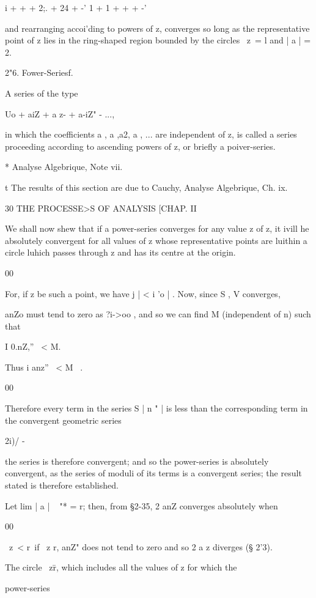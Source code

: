 i + + + 2;. + 24 + -' 1 + 1 + + + -'

and rearranging accoi'ding to powers of z, converges so long as the
representative point of z lies in the ring-shaped region bounded by
the circles \ z\ = l and | a | = 2.

2"6. Fower-Seriesf.

A series of the type

Uo + aiZ + a z- + a-iZ" - ...,

in which the coefficients a , a ,a2, a , ... are independent of z, is
called a series proceeding according to ascending powers of z, or
briefly a poiver-series.

* Analyse Algebrique, Note vii.

t The results of this section are due to Cauchy, Analyse Algebrique,
Ch. ix.



  30 THE PROCESSE>S OF ANALYSIS [CHAP. II

We shall now shew that if a power-series converges for any value z of
z, it ivill he absolutely convergent for all values of z whose
representative points are luithin a circle luhich passes through z and
has its centre at the origin.

00

For, if z be such a point, we have j | < i 'o | . Now, since S , V
converges,

anZo must tend to zero as ?i->oo , and so we can find M (independent
of n) such that

I 0.nZ,'' \ < M.

Thus i anz'' \ < M \ .

00

Therefore every term in the series S | n " | is less than the
corresponding term in the convergent geometric series

2i)/ -

the series is therefore convergent; and so the power-series is
absolutely convergent, as the series of moduli of its terms is a
convergent series; the result stated is therefore established.

Let lim | a | ~ "* = r; then, from §2-35, 2 anZ converges absolutely
when

00

\ z\ < r\ if \ z r, anZ" does not tend to zero and so 2 a z diverges
(§ 2'3).

The circle \ z\=r, which includes all the values of z for which the

power-series

